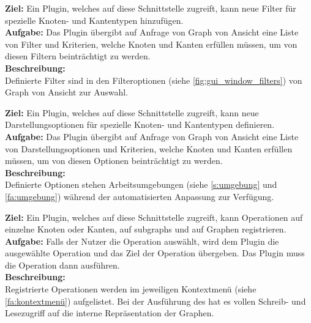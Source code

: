 \label{s:filter}
\textbf{Ziel:} Ein Plugin, welches auf diese Schnittstelle zugreift, kann neue Filter für spezielle Knoten- und Kantentypen hinzufügen.\\
\textbf{Aufgabe:}
Das Plugin übergibt auf Anfrage von Graph von Ansicht eine Liste von Filter und Kriterien, welche Knoten und Kanten erfüllen müssen, um von diesen Filtern beinträchtigt zu werden.\\
\textbf{Beschreibung:}\\
Definierte Filter sind in den Filteroptionen (siehe \ref{fig:gui_window_filters}) von Graph von Ansicht zur Auswahl.

\label{s:darstellung}
\textbf{Ziel:} Ein Plugin, welches auf diese Schnittstelle zugreift, kann neue Darstellungsoptionen für spezielle Knoten- und Kantentypen definieren.\\
\textbf{Aufgabe:}
Das Plugin übergibt auf Anfrage von Graph von Ansicht eine Liste von Darstellungsoptionen und Kriterien, welche Knoten und Kanten erfüllen müssen, um von diesen Optionen beinträchtigt zu werden.\\
\textbf{Beschreibung:}\\
Definierte Optionen stehen Arbeitsumgebungen (siehe \ref{s:umgebung} und \ref{fa:umgebung}) während der automatisierten Anpassung zur Verfügung.

\label{s:operationen}
\textbf{Ziel:} Ein Plugin, welches auf diese Schnittstelle zugreift, kann Operationen auf einzelne Knoten oder Kanten, auf \glspl{subgraph} und auf Graphen registrieren.\\
\textbf{Aufgabe:}
Falls der Nutzer die Operation auswählt, wird dem Plugin die ausgewählte Operation und das Ziel der Operation übergeben. Das Plugin muss die Operation dann ausführen.\\
\textbf{Beschreibung:}\\
Registrierte Operationen werden im jeweiligen Kontextmenü (siehe \ref{fa:kontextmenü}) aufgelistet.
Bei der Ausführung des hat es vollen Schreib- und Lesezugriff auf die interne Repräsentation der Graphen.\\
